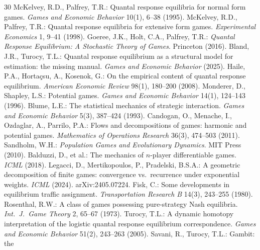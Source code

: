 \documentclass[11pt]{article}
\begin{document}

\begin{thebibliography}{30}
 McKelvey, R.D., Palfrey, T.R.:
Quantal response equilibria for normal form games. \emph{Games and Economic
Behavior} 10(1), 6--38 (1995).
 McKelvey, R.D., Palfrey, T.R.:
Quantal response equilibria for extensive form games. \emph{Experimental
Economics} 1, 9--41 (1998).
 Goeree, J.K., Holt, C.A., Palfrey, T.R.:
\emph{Quantal Response Equilibrium: A Stochastic Theory of Games}. Princeton (2016).
 Bland, J.R., Turocy, T.L.: Quantal
response equilibrium as a structural model for estimation: the missing manual.
\emph{Games and Economic Behavior} (2025).
 Haile, P.A., Horta\c{c}su, A., Kosenok, G.:
On the empirical content of quantal response equilibrium. \emph{American Economic
Review} 98(1), 180--200 (2008).
 Monderer, D., Shapley, L.S.:
Potential games. \emph{Games and Economic Behavior} 14(1), 124--143 (1996).
 Blume, L.E.: The statistical mechanics of
strategic interaction. \emph{Games and Economic Behavior} 5(3), 387--424 (1993).
 Candogan, O., Menache, I., Ozdaglar,
A., Parrilo, P.A.: Flows and decompositions of games: harmonic and potential
games. \emph{Mathematics of Operations Research} 36(3), 474--503 (2011).
 Sandholm, W.H.: \emph{Population Games and
Evolutionary Dynamics}. MIT Press (2010).
 Balduzzi, D., et al.: The mechanics
of $n$-player differentiable games. \emph{ICML} (2018).
 Legacci, D., Mertikopoulos, P.,
Pradelski, B.S.A.: A geometric decomposition of finite games: convergence vs.\
recurrence under exponential weights. \emph{ICML} (2024). arXiv:2405.07224.
\bibitem[Fisk(1980)]{fisk1980} Fisk, C.: Some developments in equilibrium traffic
assignment. \emph{Transportation Research B} 14(3), 243--255 (1980).
\bibitem[Rosenthal(1973)]{rosenthal1973} Rosenthal, R.W.: A class of games
possessing pure-strategy Nash equilibria. \emph{Int.\ J.\ Game Theory} 2, 65--67 (1973).
\bibitem[Turocy(2005)]{turocy2005} Turocy, T.L.: A dynamic homotopy interpretation
of the logistic quantal response equilibrium correspondence. \emph{Games and
Economic Behavior} 51(2), 243--263 (2005).
 Savani, R., Turocy, T.L.: Gambit: the

\end{thebibliography}
\end{document}
